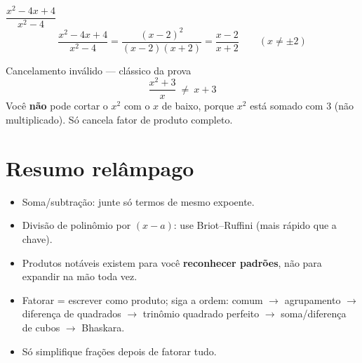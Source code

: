 \documentclass[12pt,a4paper]{article}
\begin{document}
\begin{exemplo}{$\dfrac{x^2-4x+4}{x^2-4}$}
\[
\frac{x^2-4x+4}{x^2-4} = \frac{(x-2)^2}{(x-2)(x+2)} = \frac{x-2}{x+2} \qquad (x\neq\pm2)
\]
\end{exemplo}

\begin{atencao}{Cancelamento inválido — clássico da prova}
\[
\frac{x^2+3}{x} \ \neq\ x+3
\]
Você \textbf{não} pode cortar o $x^2$ com o $x$ de baixo, porque $x^2$ está
somado com $3$ (não multiplicado). Só cancela fator de produto completo.
\end{atencao}

\section*{Resumo relâmpago}
\begin{itemize}[nosep]
  \item Soma/subtração: junte só termos de mesmo expoente.
  \item Divisão de polinômio por $(x-a)$: use Briot--Ruffini (mais rápido que a chave).
  \item Produtos notáveis existem para você \textbf{reconhecer padrões}, não para expandir na mão toda vez.
  \item Fatorar = escrever como produto; siga a ordem: comum $\to$ agrupamento $\to$ diferença de quadrados $\to$ trinômio quadrado perfeito $\to$ soma/diferença de cubos $\to$ Bhaskara.
  \item Só simplifique frações depois de fatorar tudo.
\end{itemize}
\end{document}
